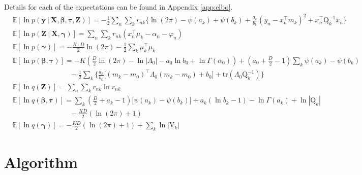 \documentclass[twoside,11pt]{article}
\newcommand\given[1][]{\:#1\vert\:}
\newcommand{\transpose}[1]{#1^{\intercal}}
\newcommand{\nsum}{\sum\limits_{n}}
\newcommand{\ksum}{\sum\limits_{k}}
\newcommand{\boldbeta}{\boldsymbol\beta}
\newcommand{\boldgamma}{\boldsymbol\gamma}
\newcommand{\boldtau}{\boldsymbol\tau}
\newcommand{\E}{\mathbb{E}}
\newcommand{\pr}[1]{p \left( #1 \right)}
\begin{document}
Details for each of the expectations can be found in Appendix \ref{app:elbo}. 
\begin{align*}
	& \E[\ln\pr{\mathbf{y} \given \mathbf{X}, \boldbeta, \boldtau, \mathbf{Z}}] = -\frac{1}{2}\nsum \ksum r_{nk} \Big\{ \ln (2\pi) - \psi(a_k) + \psi(b_k)  + \frac{a_k}{b_k}(y_n - \transpose{x_n}m_k)^2 + \transpose{x_n}\mathrm{Q}_k^{-1}x_n \Big\} \\
	 & \E[\ln \pr{\mathbf{Z} \given \mathbf{X}, \boldgamma}] = \nsum \ksum r_{nk} \left( \transpose{x_n}\mu_k - \alpha_n - \varphi_n \right) \\
	 & \E[\ln \pr{\boldgamma}] = - \frac{K \cdot D}{2} \ln (2\pi) - \frac{1}{2} \ksum \transpose{\mu_k}\mu_k \\
	 & \E[\ln \pr{\boldbeta, \boldtau}] = - K \left(\frac{D}{2}\ln(2\pi)  - \ln |\Lambda_0| - a_0 \ln b_0 + \ln \Gamma(\alpha_0) \right) + \left( a_0 + \frac{D}{2} - 1 \right) \ksum \psi(a_k) - \psi(b_k) \\
	   & \qquad \qquad \qquad \qquad - \frac{1}{2}\ksum \Bigg\{ \frac{a_k}{b_k}\Big[\transpose{(m_k - m_0)} \Lambda_0 (m_k - m_0) + b_0 \Big] + \mathrm{tr} \left( \Lambda_0 \mathrm{Q}_{k}^{-1}\right) \Bigg\} \\
	& \E[\ln q(\mathbf{Z})] =  \nsum \ksum r_{nk} \ln r_{nk} \\
	& \E[\ln q(\boldbeta, \boldtau)] =  \ksum \left( \frac{D}{2} + a_k - 1 \right) \big[\psi(a_k) - \psi(b_k) \big] + a_k (\ln b_k - 1) - \ln \Gamma(a_k) + \ln |\mathrm{Q}_k | \\
	& \qquad \qquad \qquad \qquad -\frac{KD}{2} \left( \ln(2\pi) + 1 \right) \\
	& \E[\ln q(\boldgamma)] = - \frac{KD}{2}(\ln (2\pi) + 1) + \sum_{k} \ln|\mathrm{V}_k|
\end{align*}

\newpage

\section{Algorithm} \label{alg1}
\end{document}
